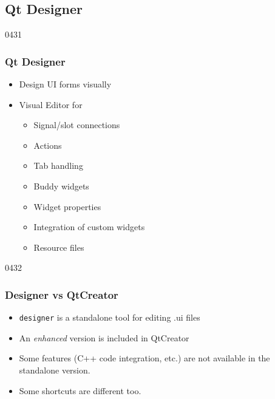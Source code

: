 %
%
%
%

\subsection{Qt Designer}
\newcommand{\uicProgram}{\iConcept{uic}\xspace}

\label{qt_designer}

\begin{slide}[fragile]{0431}
\frametitle{Qt Designer}
  \begin{itemize}
\item Design UI forms visually
  \end{itemize}
  \vfill
 \begin{itemize}
 \item Visual Editor for
   \begin{itemize}
  \item Signal/slot connections
  \item Actions
  \item Tab handling
  \item Buddy widgets
  \item Widget properties
  \item Integration of custom widgets
  \item Resource files
  \end{itemize}
\end{itemize}
\end{slide}

\begin{slide}[fragile]{0432}
\frametitle{Designer vs QtCreator}

\begin{itemize}
\item {\tt designer} is a standalone tool for editing .ui files
\item An {\it enhanced} version is included in QtCreator
\item Some features (C++ code integration, etc.) 
    are not available in the standalone version. 
\item Some shortcuts are different too. 
\end{itemize}

\end{slide}

